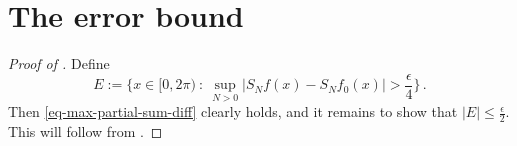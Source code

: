 \section{The error bound}
\label{10difference}


\begin{proof}[Proof of ]
\leanok
Define
$$
    E := \{x \in [0, 2\pi) \ : \ \sup_{N > 0} |S_N f(x) - S_N f_0(x)| > \frac{\epsilon}{4} \}\,.
$$
Then \eqref{eq-max-partial-sum-diff} clearly holds, and it remains to show that $|E| \le \frac{\epsilon}{2}$. This will follow from .


\end{proof}

